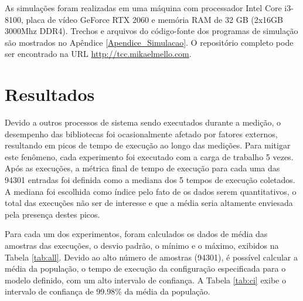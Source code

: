 As simulações foram realizadas em uma máquina com processador Intel Core i3-8100, placa de vídeo GeForce RTX 2060 e memória RAM de 32 GB (2x16GB 3000Mhz DDR4). Trechos e arquivos do código-fonte dos programas de simulação são mostrados no Apêndice \ref{Apendice_Simulacao}. O repositório completo pode ser encontrado na URL \url{http://tcc.mikaelmello.com}.

\section{Resultados}

Devido a outros processos de sistema sendo executados durante a medição, o desempenho das bibliotecas foi ocasionalmente afetado por fatores externos, resultando em picos de tempo de execução ao longo das medições. Para mitigar este fenômeno, cada experimento foi executado com a carga de trabalho 5 vezes. Após as execuções, a métrica final de tempo de execução para cada uma das 94301 entradas foi definida como a mediana dos 5 tempos de execução coletados. A mediana foi escolhida como índice pelo fato de os dados serem quantitativos, o total das execuções não ser de interesse e que a média seria altamente enviesada pela presença destes picos.

Para cada um dos experimentos, foram calculados os dados de média das amostras das execuções, o desvio padrão, o mínimo e o máximo, exibidos na Tabela \ref{tab:all}. Devido ao alto número de amostras (94301), é possível calcular a média da população, o tempo de execução da configuração especificada para o modelo definido, com um alto intervalo de confiança. A Tabela \ref{tab:ci} exibe o intervalo de confiança de 99.98\% da média da população.

